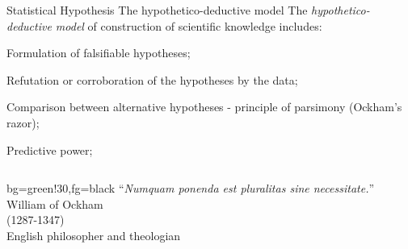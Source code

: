 \documentclass[t]{beamer}
\begin{document}

\begin{ftst}
{Statistical Hypothesis}
{The hypothetico-deductive model}
The \textit{hypothetico-deductive model} of construction of scientific knowledge includes:

\bitems Formulation of falsifiable hypotheses;
	\item Refutation or corroboration of the hypotheses by the data;
	\item Comparison between alternative hypotheses - principle of parsimony (Ockham's razor);
	\item Predictive power;
\eitem

\begin{columns}[T]
    \vhalf
	\begin{colorblock}{}{bg=green!30,fg=black}
	``\textit{Numquam ponenda est pluralitas sine necessitate.}''\\
	\flushright\vspace{-1em}\small William of Ockham\\
	\flushright\vspace{-1em}\small (1287-1347)\\
	\flushright\vspace{-1em}\small English philosopher and theologian\\
	\end{colorblock}
\end{columns}
\end{ftst}
\end{document}
